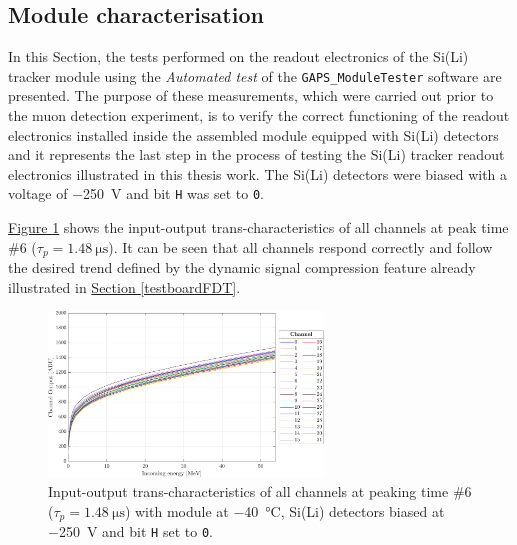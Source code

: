\subsection{Module characterisation}
\label{secResultsMuonASIC}

In this Section, the tests performed on the readout electronics of the Si(Li) tracker module using the \textit{Automated test} of the \texttt{GAPS\_ModuleTester} software are presented. The purpose of these measurements, which were carried out prior to the muon detection experiment, is to verify the correct functioning of the readout electronics installed inside the assembled module equipped with Si(Li) detectors and it represents the last step in the process of testing the Si(Li) tracker readout electronics illustrated in this thesis work. The Si(Li) detectors were biased with a voltage of \SI{-250}{\volt} and bit \texttt{H} was set to \texttt{0}.

\par
\hyperref[figFDTmodule40C250V]{Figure \ref{figFDTmodule40C250V}} shows the input-output trans-characteristics of all channels at peak time \#6 ($\tau_{p} = \SI{1.48}{\micro\second}$). It can be seen that all channels respond correctly and follow the desired trend defined by the dynamic signal compression feature already illustrated in \hyperref[testboardFDT]{Section \ref{testboardFDT}}.

\begin{figure}[h!]
    \centering
    \includegraphics[width=0.65\textwidth]{Images/chap3/results/FDT_MODULE_40C_250V.pdf}
    \caption{Input-output trans-characteristics of all channels at peaking time \#6 ($\tau_{p} = \SI{1.48}{\micro\second}$) with module at \SI{-40}{\celsius}, Si(Li) detectors biased at \SI{-250}{\volt} and bit \texttt{H} set to \texttt{0}.}
    \label{figFDTmodule40C250V}
\end{figure}

